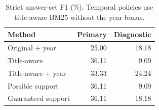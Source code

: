 \begin{table}[t]
\centering\small
\begin{tabular}{@{}lrr@{}}
\toprule
Method & Primary & Diagnostic\\
\midrule
Original + year & 25.00 & 18.18\\
Title-aware & 36.11 & 9.09\\
Title-aware + year & 33.33 & 24.24\\
Possible support & 36.11 & 9.09\\
Guaranteed support & 36.11 & 18.18\\
\bottomrule
\end{tabular}
\caption{Strict answer-set F1 (\%). Temporal policies use title-aware BM25 without the year bonus.}
\label{tab:reader_main}
\end{table}
